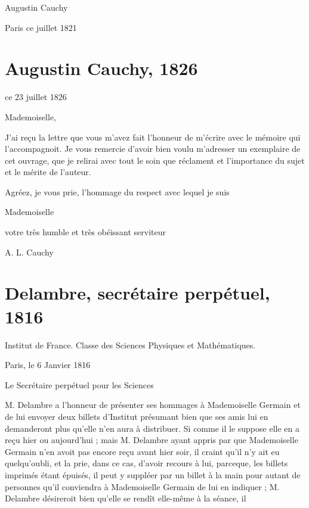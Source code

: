 \documentclass[11pt,a4paper]{article}
\begin{document}
Augustin Cauchy

Paris ce  juillet 1821

\section{Augustin Cauchy, 1826}


 ce 23 juillet 1826

Mademoiselle,

J'ai reçu la lettre que vous m'avez fait l'honneur de m'écrire avec le mémoire
qui l'accompagnoit. Je vous remercie d'avoir bien voulu m'adresser un
exemplaire de cet ouvrage, que je relirai avec tout le soin que réclament et
l'importance du sujet et le mérite de l'auteur.

Agréez, je vous prie, l'hommage du respect avec lequel je suis

Mademoiselle

votre très humble et très obéissant serviteur

A. L. Cauchy

\section{Delambre, secrétaire perpétuel, 1816}


Institut de France. Classe des Sciences Physiques et Mathématiques.

Paris, le 6 Janvier 1816

Le Secrétaire perpétuel pour les Sciences

M. Delambre a l'honneur de présenter ses hommages à Mademoiselle Germain et de
lui envoyer deux billets d'Institut présumant bien que ses amis lui en
demanderont plus qu'elle n'en aura à distribuer. Si comme il le suppose elle
en a reçu hier ou aujourd'hui ; mais M. Delambre ayant appris par
 que Mademoiselle Germain n'en avoit pas encore
reçu avant hier soir, il craint qu'il n'y ait eu quelqu'oubli, et la prie,
dans ce cas, d'avoir recours à lui, parceque, les billets imprimés étant
épuisés, il peut y suppléer par un billet à la main pour autant de personnes
qu'il conviendra à Mademoiselle Germain de lui en indiquer ; M. Delambre
désireroit bien qu'elle se rendît elle-même à la séance, il
\end{document}
